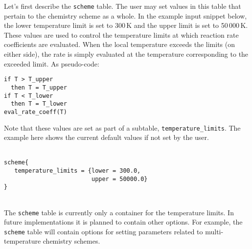 Let's first describe the \texttt{scheme} table.
The user may set values in this table that pertain to the chemistry scheme as a whole.
In the example input snippet below, the lower temperature limit is set to 300\,K
and the upper limit is set to 50\,000\,K.
These values are used to control the temperature limits at which reaction rate coefficients
are evaluated.
When the local temperature exceeds the limits (on either side), the rate is simply
evaluated at the temperature corresponding to the exceeded limit.
As pseudo-code:
\begin{verbatim}
if T > T_upper
  then T = T_upper
if T < T_lower
  then T = T_lower
eval_rate_coeff(T)
\end{verbatim}
Note that these values are set as part of a subtable, \texttt{temperature\_limits}.
The example here shows the current default values if not set by the user.\\
%
\topbar\\
\begin{verbatim}
scheme{
   temperature_limits = {lower = 300.0,
                         upper = 50000.0}
}
\end{verbatim}
\bottombar\\
%
The \texttt{scheme} table is currently only a container for the temperature limits.
In future implementations it is planned to contain other options.
For example, the \texttt{scheme} table will contain options for setting parameters related
to multi-temperature chemistry schemes.

